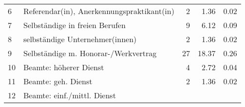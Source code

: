 \begin{longtable}{lXrrr}
     6 &
     \multicolumn{1}{X}{ Referendar(in), Anerkennungspraktikant(in)   } &


       \num{2} &
       \num[round-mode=places,round-precision=2]{1.36} &
         \num[round-mode=places,round-precision=2]{0.02} \\

     7 &
     \multicolumn{1}{X}{ Selbständige in freien Berufen   } &


       \num{9} &
       \num[round-mode=places,round-precision=2]{6.12} &
         \num[round-mode=places,round-precision=2]{0.09} \\

     8 &
     \multicolumn{1}{X}{ selbständige Unternehmer(innen)   } &


       \num{2} &
       \num[round-mode=places,round-precision=2]{1.36} &
         \num[round-mode=places,round-precision=2]{0.02} \\

     9 &
     \multicolumn{1}{X}{ Selbständige m. Honorar-/Werkvertrag   } &


       \num{27} &
       \num[round-mode=places,round-precision=2]{18.37} &
         \num[round-mode=places,round-precision=2]{0.26} \\

     10 &
     \multicolumn{1}{X}{ Beamte: höherer Dienst   } &


       \num{4} &
       \num[round-mode=places,round-precision=2]{2.72} &
         \num[round-mode=places,round-precision=2]{0.04} \\

     11 &
     \multicolumn{1}{X}{ Beamte: geh. Dienst   } &


       \num{2} &
       \num[round-mode=places,round-precision=2]{1.36} &
         \num[round-mode=places,round-precision=2]{0.02} \\

     12 &
     \multicolumn{1}{X}{ Beamte: einf./mittl. Dienst   } &



\end{longtable}
